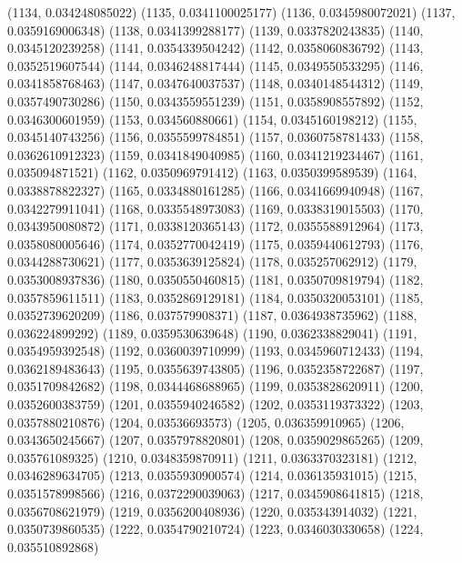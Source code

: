 {					(1134, 0.034248085022)
					(1135, 0.0341100025177)
					(1136, 0.0345980072021)
					(1137, 0.0359169006348)
					(1138, 0.0341399288177)
					(1139, 0.0337820243835)
					(1140, 0.0345120239258)
					(1141, 0.0354339504242)
					(1142, 0.0358060836792)
					(1143, 0.0352519607544)
					(1144, 0.0346248817444)
					(1145, 0.0349550533295)
					(1146, 0.0341858768463)
					(1147, 0.0347640037537)
					(1148, 0.0340148544312)
					(1149, 0.0357490730286)
					(1150, 0.0343559551239)
					(1151, 0.0358908557892)
					(1152, 0.0346300601959)
					(1153, 0.034560880661)
					(1154, 0.0345160198212)
					(1155, 0.0345140743256)
					(1156, 0.0355599784851)
					(1157, 0.0360758781433)
					(1158, 0.0362610912323)
					(1159, 0.0341849040985)
					(1160, 0.0341219234467)
					(1161, 0.035094871521)
					(1162, 0.0350969791412)
					(1163, 0.0350399589539)
					(1164, 0.0338878822327)
					(1165, 0.0334880161285)
					(1166, 0.0341669940948)
					(1167, 0.0342279911041)
					(1168, 0.0335548973083)
					(1169, 0.0338319015503)
					(1170, 0.0343950080872)
					(1171, 0.0338120365143)
					(1172, 0.0355588912964)
					(1173, 0.0358080005646)
					(1174, 0.0352770042419)
					(1175, 0.0359440612793)
					(1176, 0.0344288730621)
					(1177, 0.0353639125824)
					(1178, 0.035257062912)
					(1179, 0.0353008937836)
					(1180, 0.0350550460815)
					(1181, 0.0350709819794)
					(1182, 0.0357859611511)
					(1183, 0.0352869129181)
					(1184, 0.0350320053101)
					(1185, 0.0352739620209)
					(1186, 0.037579908371)
					(1187, 0.0364938735962)
					(1188, 0.036224899292)
					(1189, 0.0359530639648)
					(1190, 0.0362338829041)
					(1191, 0.0354959392548)
					(1192, 0.0360039710999)
					(1193, 0.0345960712433)
					(1194, 0.0362189483643)
					(1195, 0.0355639743805)
					(1196, 0.0352358722687)
					(1197, 0.0351709842682)
					(1198, 0.0344468688965)
					(1199, 0.0353828620911)
					(1200, 0.0352600383759)
					(1201, 0.0355940246582)
					(1202, 0.0353119373322)
					(1203, 0.0357880210876)
					(1204, 0.03536693573)
					(1205, 0.036359910965)
					(1206, 0.0343650245667)
					(1207, 0.0357978820801)
					(1208, 0.0359029865265)
					(1209, 0.035761089325)
					(1210, 0.0348359870911)
					(1211, 0.0363370323181)
					(1212, 0.0346289634705)
					(1213, 0.0355930900574)
					(1214, 0.036135931015)
					(1215, 0.0351578998566)
					(1216, 0.0372290039063)
					(1217, 0.0345908641815)
					(1218, 0.0356708621979)
					(1219, 0.0356200408936)
					(1220, 0.035343914032)
					(1221, 0.0350739860535)
					(1222, 0.0354790210724)
					(1223, 0.0346030330658)
					(1224, 0.035510892868)
}
